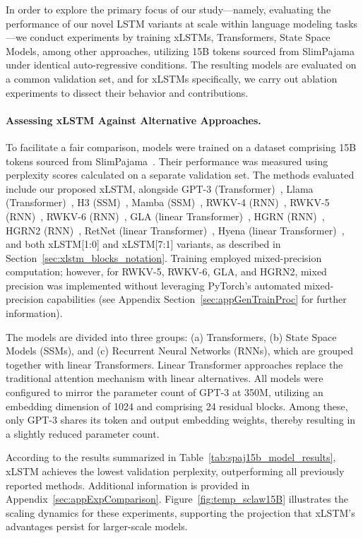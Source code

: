 In order to explore the primary focus of our study—namely, evaluating the performance of our novel LSTM variants at scale within language modeling tasks—we conduct experiments by training xLSTMs, Transformers, State Space Models, among other approaches, utilizing 15B tokens sourced from SlimPajama under identical auto-regressive conditions. The resulting models are evaluated on a common validation set, and for xLSTMs specifically, we carry out ablation experiments to dissect their behavior and contributions.

\paragraph{Assessing xLSTM Against Alternative Approaches.} To facilitate a fair comparison, models were trained on a dataset comprising 15B tokens sourced from SlimPajama~\citep{Soboleva:23}. Their performance was measured using perplexity scores calculated on a separate validation set. The methods evaluated include our proposed xLSTM, alongside GPT-3 (Transformer)~\citep{Brown:20short}, Llama (Transformer)~\citep{Touvron:23arxiv}, H3 (SSM)~\citep{Fu:23}, Mamba (SSM)~\citep{Gu:24arxiv}, RWKV-4 (RNN)~\citep{Peng:23arxivshort}, RWKV-5 (RNN)~\citep{Peng:24arxivshort}, RWKV-6 (RNN)~\citep{Peng:24arxivshort}, GLA (linear Transformer)~\citep{Yang:23arxiv}, HGRN (RNN)~\citep{Qin:23}, HGRN2 (RNN)~\citep{Qin:24arxiv}, RetNet (linear Transformer)~\citep{Sun:23arxiv}, Hyena (linear Transformer)~\citep{Poli:23}, and both xLSTM[1:0] and xLSTM[7:1] variants, as described in Section~\ref{sec:xlstm_blocks_notation}. Training employed mixed-precision computation; however, for RWKV-5, RWKV-6, GLA, and HGRN2, mixed precision was implemented without leveraging PyTorch's automated mixed-precision capabilities (see Appendix Section~\ref{sec:appGenTrainProc} for further information).

The models are divided into three groups: (a) Transformers, (b) State Space Models (SSMs), and (c) Recurrent Neural Networks (RNNs), which are grouped together with linear Transformers. Linear Transformer approaches replace the traditional attention mechanism with linear alternatives. All models were configured to mirror the parameter count of GPT-3 at 350M, utilizing an embedding dimension of 1024 and comprising 24 residual blocks. Among these, only GPT-3 shares its token and output embedding weights, thereby resulting in a slightly reduced parameter count.

According to the results summarized in Table~\ref{tab:spaj15b_model_results}, xLSTM achieves the lowest validation perplexity, outperforming all previously reported methods. Additional information is provided in Appendix~\ref{sec:appExpComparison}. Figure~\ref{fig:temp_sclaw15B} illustrates the scaling dynamics for these experiments, supporting the projection that xLSTM’s advantages persist for larger-scale models.

